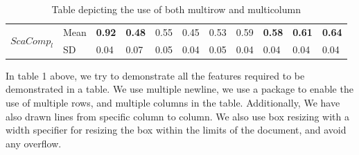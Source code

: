 \documentclass[english,12pt]{article}
\begin{document}
\begin{table}[H]
{{\begin{tabular}{|C{16mm}|C{7.5mm}|C{6.5mm}|C{6.5mm}|C{9mm}|C{7mm}|C{7mm}|C{6.5mm}|C{7mm}|C{9.5mm}|m{7mm}|}
                       & Mean & \textbf{0.92}     & \textbf{0.48}     & 0.55     & 0.45     & 0.53     & 0.59     & \textbf{0.58}     & \textbf{0.61}       & \textbf{0.64}      \\  
                                                & SD   & 0.04     & 0.07     & 0.05     & 0.04     & 0.05     & 0.04     & 0.04     & 0.04       & 0.04      \\ 
\end{tabular}}}
\caption{Table depicting the use of both multirow and multicolumn}
\label{Table:1}
\end{table}
\begin{Large}
In table 1 above, we try to demonstrate all the features required to be demonstrated in a table. We use
multiple newline, we use a package to enable the use
of multiple rows, and multiple columns in the table.
Additionally, We have also drawn lines from specific
column to column. We also use box resizing with a
width specifier for resizing the box within the limits of
the document, and avoid any overflow.
\end{Large}
\newpage
\end{document}
